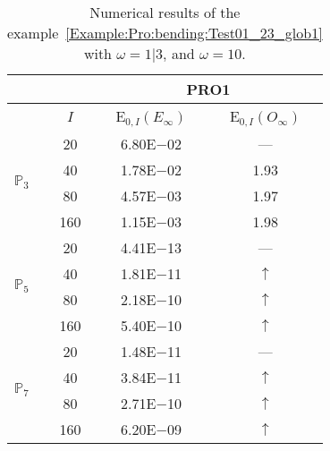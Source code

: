 \begin{table}[H]
\caption{Numerical results of the example~\ref{Example:Pro:bending:Test01_23_glob1} with $\omega=1|3$, and $\omega=10$.}
\setlength{\tabcolsep}{5pt}
\centering
\begin{tabular}{@{}l c c c@{}}
\toprule
 &  & \multicolumn{2}{c}{PRO1}\\
\midrule
 & $I$ & E$_{0,I}(E_{\infty})$ & E$_{0,I}(O_{\infty})$\\
\midrule
\multirow{4}{*}{$\mathbb{P}_{3}$} & 20 & 6.80E$-$02 & ---\\
 & 40 & 1.78E$-$02 & 1.93\\
 & 80 & 4.57E$-$03 & 1.97\\
 & 160 & 1.15E$-$03 & 1.98\\
\midrule
\multirow{4}{*}{$\mathbb{P}_{5}$} & 20 & 4.41E$-$13 & ---\\
 & 40 & 1.81E$-$11 & $\uparrow$\\
 & 80 & 2.18E$-$10 & $\uparrow$\\
 & 160 & 5.40E$-$10 & $\uparrow$\\
\midrule
\multirow{4}{*}{$\mathbb{P}_{7}$} & 20 & 1.48E$-$11 & ---\\
 & 40 & 3.84E$-$11 & $\uparrow$\\
 & 80 & 2.71E$-$10 & $\uparrow$\\
 & 160 & 6.20E$-$09 & $\uparrow$\\
\bottomrule
\end{tabular}
\label{Table:PRO:test_01_23_test12}
\end{table}
